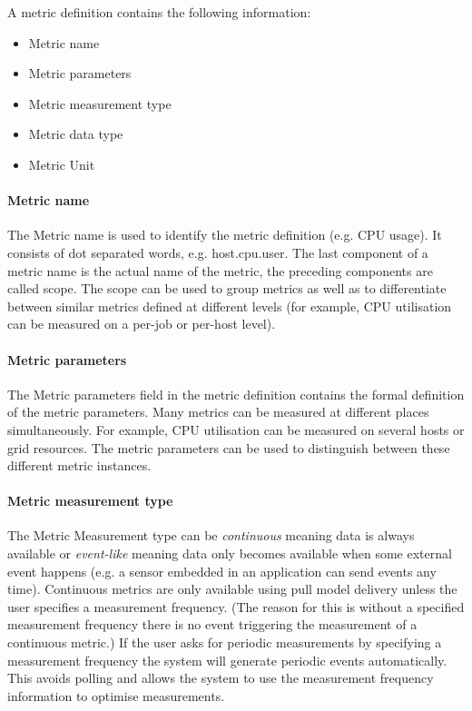 \documentclass[$Date: 2003/06/26 19:29:31 $]{glabarticle}
\begin{document}
A metric definition contains the following information:
\begin{itemize}
  \item Metric name
  \item Metric parameters
  \item Metric measurement type
 \item Metric data type
  \item Metric Unit
\end{itemize}
\paragraph{Metric name} The Metric name is used to identify the metric definition (e.g. CPU usage). It 
consists of dot separated words, e.g. host.cpu.user. The last component of a metric name is the actual 
name of the metric, the preceding components are called scope. The scope can be used to group metrics 
as well as to differentiate between similar metrics defined at different levels (for example, CPU utilisation 
can be measured on a per-job or per-host level).

\paragraph{Metric parameters} The Metric parameters field in the metric definition contains the formal
definition of the metric parameters. Many metrics can be measured at different places simultaneously. 
For example, CPU utilisation can be measured on several hosts or grid resources. The metric parameters 
can be used to distinguish between these different metric instances.

\paragraph{Metric measurement type} The Metric Measurement type can be \textit{continuous} meaning 
data is always available or \textit{event-like} meaning data only becomes available when some external 
event happens  (e.g. a sensor embedded in an application can send events any time). Continuous metrics 
are only available using pull model delivery unless the user specifies a measurement frequency. (The 
reason for this is without a specified measurement frequency there is no event triggering the measurement 
of a continuous metric.) If the user asks for periodic measurements by specifying a measurement frequency 
the system will generate periodic events automatically. This avoids polling and allows the system to use the
measurement frequency information to optimise measurements.
\end{document}
